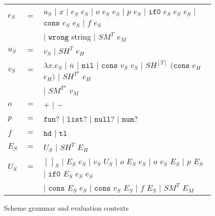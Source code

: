 \begin{figure}[p]
\centering
\begin{tabular}{lcl}
\vspace{5pt}

$e_{S}$ & $=$ & $u_{S}$ $\vert$ $x$ $\vert$ $e_{S}$ $e_{S}$ $\vert$ $o$ $e_{S}$ $e_{S}$ $\vert$ $p$ $e_{S}$ $\vert$ $\mathtt{if0}$ $e_{S}$ $e_{S}$ $e_{S}$ $\vert$ $\mathtt{cons}$ $e_{S}$ $e_{S}$ $\vert$ $f$ $e_{S}$ \\

\vspace{5pt}

&& $\vert$ $\mathtt{wrong}$ string $\vert$ $SM^{T}$ $e_{M}$ \\

\vspace{5pt}

$u_{S}$ & $=$ & $v_{S}$ $\vert$ $SH^{T}$ $e_{H}$ \\

\vspace{5pt}

$v_{S}$ & $=$ & $\lambda x.e_{S}$ $\vert$ $\overline{n}$ $\vert$ $\mathtt{nil}$ $\vert$ $\mathtt{cons}$ $v_{S}$ $v_{S}$ $\vert$ $SH^{[T]}$ $(\mathtt{cons}$ $e_{H}$ $e_{H})$ $\vert$ $SH^{T^{a}}$ $e_{H}$ \\

\vspace{5pt}

&& $\vert$ $SM^{T^{a}}$ $v_{M}$ \\

\vspace{5pt}

$o$ & $=$ & $+$ $\vert$ $-$ \\

\vspace{5pt}

$p$ & $=$ & $\mathtt{fun?}$ $\vert$ $\mathtt{list?}$ $\vert$ $\mathtt{null?}$ $\vert$ $\mathtt{num?}$ \\

\vspace{5pt}

$f$ & $=$ & $\mathtt{hd}$ $\vert$ $\mathtt{tl}$ \\

\vspace{5pt}

$E_{S}$ & $=$ & $U_{S}$ $\vert$ $SH^{T}$ $E_{H}$ \\

\vspace{5pt}

$U_{S}$ & $=$ & $[\,]_{S}$ $\vert$ $E_{S}$ $e_{S}$ $\vert$ $v_{S}$ $U_{S}$ $\vert$ $o$ $E_{S}$ $e_{S}$ $\vert$ $o$ $v_{S}$ $E_{S}$ $\vert$ $p$ $E_{S}$ $\vert$ $\mathtt{if0}$ $E_{S}$ $e_{S}$ $e_{S}$ \\

\vspace{5pt}

&& $\vert$ $\mathtt{cons}$ $E_{S}$ $e_{S}$ $\vert$ $\mathtt{cons}$ $v_{S}$ $E_{S}$ $\vert$ $f$ $E_{S}$ $\vert$ $SM^{T}$ $E_{M}$
\end{tabular}
\caption{Scheme grammar and evaluation contexts}
\label{sg}
\end{figure}
